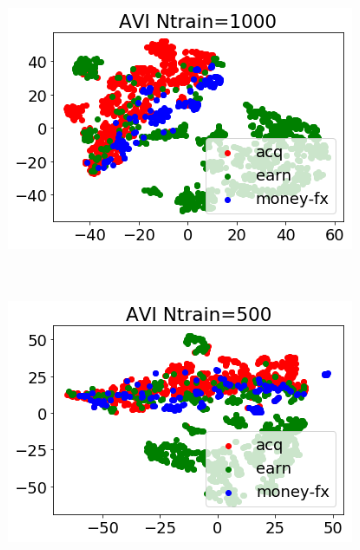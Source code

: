\documentclass[twoside]{article}
\begin{document}
\begin{figure}
    \centering
    \begin{subfigure}[t]{0.33\textwidth}
        \centering
        \includegraphics[width=1.0\linewidth]{reuters_avi1000_h150.png}
        \label{fig: reuters_h150_avi_1000}
    \end{subfigure}%
    ~
    \begin{subfigure}[t]{0.33\textwidth}
        \centering
        \includegraphics[width=1.0\linewidth]{reuters_avi500_h150.png}
        \label{fig: reuters_h150_avi_500}
    \end{subfigure}%
    ~
    \begin{subfigure}[t]{0.33\textwidth}
        \centering

\end{subfigure}
\end{figure}
\end{document}
